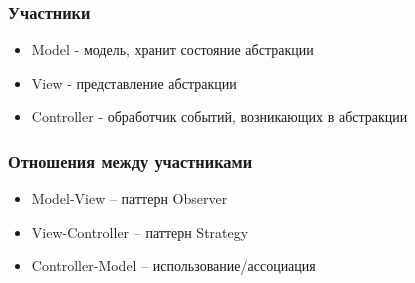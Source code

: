 \documentclass[handout]{beamer}
\begin{document}
\begin{frame}[fragile]
\frametitle{Участники}
\begin{itemize}
\item Model - модель, хранит состояние абстракции
\item View - представление абстракции
\item Controller - обработчик событий, возникающих в абстракции
\end{itemize}
\end{frame}


\begin{frame}[fragile]
\frametitle{Отношения между участниками}
\begin{itemize}
\item Model-View -- паттерн Observer
\item View-Controller -- паттерн Strategy
\item Controller-Model -- использование/ассоциация
\end{itemize}
\end{frame}
\end{document}

